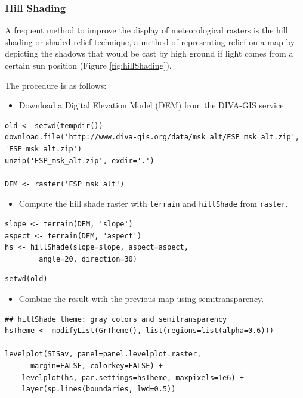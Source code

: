 \documentclass[smallroyalvopaper]{memoir}
\begin{document}
\subsubsection{Hill Shading}
\label{sec-1-1-1}
A frequent method to improve the display of meteorological rasters is
the hill shading or shaded relief technique, a method of representing
relief on a map by depicting the shadows that would be cast by high
ground if light comes from a certain sun position (Figure
\ref{fig:hillShading}).

The procedure is as follows:

\begin{itemize}
\item Download a Digital Elevation Model (DEM) from the DIVA-GIS service.
\end{itemize}

\lstset{language=R,numbers=none}
\begin{lstlisting}
old <- setwd(tempdir())
download.file('http://www.diva-gis.org/data/msk_alt/ESP_msk_alt.zip', 'ESP_msk_alt.zip')
unzip('ESP_msk_alt.zip', exdir='.')

DEM <- raster('ESP_msk_alt')
\end{lstlisting}

\begin{itemize}
\item Compute the hill shade raster with \texttt{terrain} and \texttt{hillShade} from \texttt{raster}.
\end{itemize}

\lstset{language=R,numbers=none}
\begin{lstlisting}
slope <- terrain(DEM, 'slope')
aspect <- terrain(DEM, 'aspect')
hs <- hillShade(slope=slope, aspect=aspect,
		angle=20, direction=30)
\end{lstlisting}
\lstset{language=R,numbers=none}
\begin{lstlisting}
setwd(old)
\end{lstlisting}

\begin{itemize}
\item Combine the result with the previous map using semitransparency.
\end{itemize}

\lstset{language=R,numbers=none}
\begin{lstlisting}
## hillShade theme: gray colors and semitransparency
hsTheme <- modifyList(GrTheme(), list(regions=list(alpha=0.6)))

levelplot(SISav, panel=panel.levelplot.raster,
	  margin=FALSE, colorkey=FALSE) +
    levelplot(hs, par.settings=hsTheme, maxpixels=1e6) +
    layer(sp.lines(boundaries, lwd=0.5))
\end{lstlisting}
\end{document}
